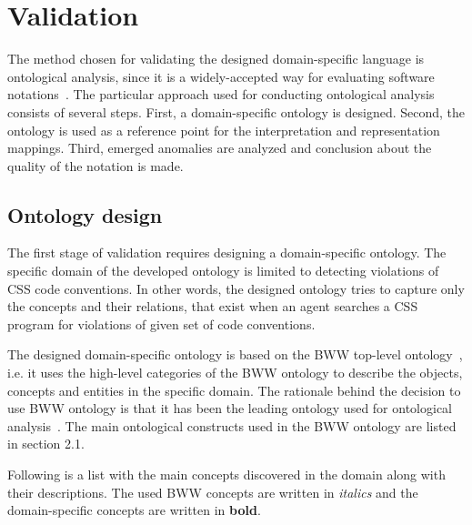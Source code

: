 \documentclass[parskip=full]{uvamscse}
\begin{document}
\section{Validation}

The method chosen for validating the designed domain-specific language is ontological analysis, since it is a widely-accepted way for evaluating software notations~\cite{opdahl2002ontological, green2000integrated, moody2009physics, parsons1997using, weber1996analytical}. The particular approach used for conducting ontological analysis consists of several steps. First, a domain-specific ontology is designed. Second, the ontology is used as a reference point for the interpretation and representation mappings. Third, emerged anomalies are analyzed and conclusion about the quality of the notation is made.

\subsection{Ontology design}

The first stage of validation requires designing a domain-specific ontology. The specific domain of the developed ontology is limited to detecting violations of CSS code conventions. In other words, the designed ontology tries to capture only the concepts and their relations, that exist when an agent searches a CSS program for violations of given set of code conventions.

The designed domain-specific ontology is based on the BWW top-level ontology~\cite{wand1990ontological}, i.e. it uses the high-level categories of the BWW ontology to describe the objects, concepts and entities in the specific domain. The rationale behind the decision to use BWW ontology is that it has been the leading ontology used for ontological analysis~\cite{moody2009physics}. The main ontological constructs used in the BWW ontology are listed in section 2.1. 

Following is a list with the main concepts discovered in the domain along with their descriptions. The used BWW concepts are written in \textit{italics} and the domain-specific concepts are written in \textbf{bold}.
\end{document}
